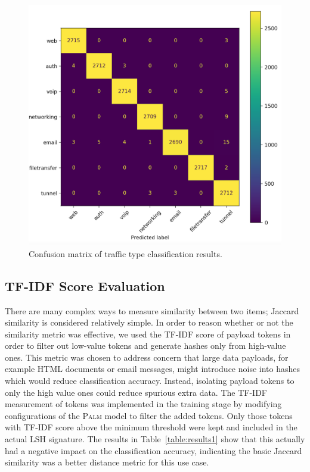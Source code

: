 \begin{figure} [hbt!]
  \centering
  \includegraphics[width=0.8\columnwidth]{chapters/4/img/traffic_class_results.png}
  \caption{Confusion matrix of traffic type classification results.}
  \label{fig:trafficresults}
\end{figure}

\subsection{TF-IDF Score Evaluation}

There are many complex ways to measure similarity between two items; Jaccard similarity is considered relatively simple. In order to reason whether or not the similarity metric was effective, we used the TF-IDF score of payload tokens in order to filter out low-value tokens and generate hashes only from high-value ones. This metric was chosen to address concern that large data payloads, for example HTML documents or email messages, might introduce noise into hashes which would reduce classification accuracy. Instead, isolating payload tokens to only the high value ones could reduce spurious extra data. The TF-IDF measurement of tokens was implemented in the training stage by modifying configurations of the \textsc{Palm} model to filter the added tokens. Only those tokens with TF-IDF score above the minimum threshold were kept and included in the actual LSH signature. The results in Table~\ref{table:results1} show that this actually had a negative impact on the classification accuracy, indicating the basic Jaccard similarity was a better distance metric for this use case.

